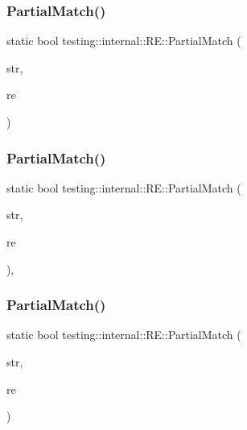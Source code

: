 \subsubsection{\texorpdfstring{PartialMatch()}{PartialMatch()}\hspace{0.1cm}{\footnotesize\ttfamily [4/6]}}
{\footnotesize\ttfamily static bool testing\+::internal\+::\+R\+E\+::\+Partial\+Match (\begin{DoxyParamCaption}\item[{const char $\ast$}]{str,  }\item[{const \mbox{\hyperlink{classtesting_1_1internal_1_1_r_e}{RE}} \&}]{re }\end{DoxyParamCaption})\hspace{0.3cm}{\ttfamily [static]}}

\mbox{\label{classtesting_1_1internal_1_1_r_e_a1e81f9a87211bdca645e025f8f0236c8}} 
\subsubsection{\texorpdfstring{PartialMatch()}{PartialMatch()}\hspace{0.1cm}{\footnotesize\ttfamily [5/6]}}
{\footnotesize\ttfamily static bool testing\+::internal\+::\+R\+E\+::\+Partial\+Match (\begin{DoxyParamCaption}\item[{const \+::std\+::string \&}]{str,  }\item[{const \mbox{\hyperlink{classtesting_1_1internal_1_1_r_e}{RE}} \&}]{re }\end{DoxyParamCaption})\hspace{0.3cm}{\ttfamily [inline]}, {\ttfamily [static]}}

\mbox{\label{classtesting_1_1internal_1_1_r_e_a97495dd4c2bb9589522823f060c8e8ba}} 
\subsubsection{\texorpdfstring{PartialMatch()}{PartialMatch()}\hspace{0.1cm}{\footnotesize\ttfamily [6/6]}}
{\footnotesize\ttfamily static bool testing\+::internal\+::\+R\+E\+::\+Partial\+Match (\begin{DoxyParamCaption}\item[{const char $\ast$}]{str,  }\item[{const \mbox{\hyperlink{classtesting_1_1internal_1_1_r_e}{RE}} \&}]{re }\end{DoxyParamCaption})\hspace{0.3cm}{\ttfamily [static]}}

